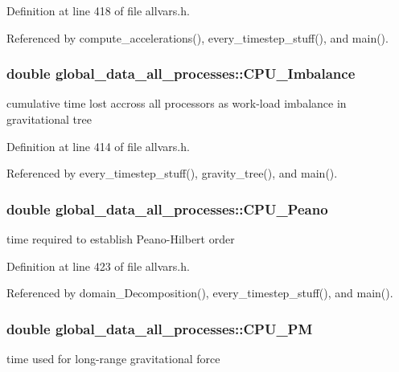 Definition at line 418 of file allvars.h.



Referenced by compute\_\-accelerations(), every\_\-timestep\_\-stuff(), and main().

\hypertarget{structglobal__data__all__processes_a94e4eed16c5b353ec3c3c9ce380ec96a}{
\subsubsection[{CPU\_\-Imbalance}]{\setlength{\rightskip}{0pt plus 5cm}double {\bf global\_\-data\_\-all\_\-processes::CPU\_\-Imbalance}}}
\label{structglobal__data__all__processes_a94e4eed16c5b353ec3c3c9ce380ec96a}
cumulative time lost accross all processors as work-\/load imbalance in gravitational tree 

Definition at line 414 of file allvars.h.



Referenced by every\_\-timestep\_\-stuff(), gravity\_\-tree(), and main().

\hypertarget{structglobal__data__all__processes_a3d1492ec738b3ebf2025de1d2f398b7d}{
\subsubsection[{CPU\_\-Peano}]{\setlength{\rightskip}{0pt plus 5cm}double {\bf global\_\-data\_\-all\_\-processes::CPU\_\-Peano}}}
\label{structglobal__data__all__processes_a3d1492ec738b3ebf2025de1d2f398b7d}
time required to establish Peano-\/Hilbert order 

Definition at line 423 of file allvars.h.



Referenced by domain\_\-Decomposition(), every\_\-timestep\_\-stuff(), and main().

\hypertarget{structglobal__data__all__processes_a2251bf94479cb20a7af9c34ed56587d1}{
\subsubsection[{CPU\_\-PM}]{\setlength{\rightskip}{0pt plus 5cm}double {\bf global\_\-data\_\-all\_\-processes::CPU\_\-PM}}}
\label{structglobal__data__all__processes_a2251bf94479cb20a7af9c34ed56587d1}
time used for long-\/range gravitational force 

